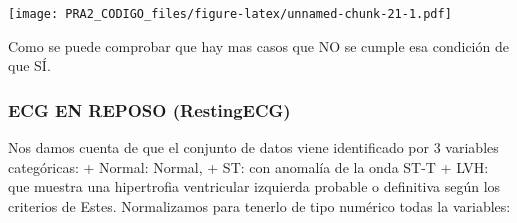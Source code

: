 \documentclass[
]{article}
\newenvironment{Shaded}{\begin{snugshade}}{\end{snugshade}}
\newcommand{\AttributeTok}[1]{\textcolor[rgb]{0.80,0.80,0.80}{#1}}
\newcommand{\ConstantTok}[1]{\textcolor[rgb]{0.86,0.64,0.64}{\textbf{#1}}}
\newcommand{\DecValTok}[1]{\textcolor[rgb]{0.86,0.86,0.80}{#1}}
\newcommand{\FloatTok}[1]{\textcolor[rgb]{0.75,0.75,0.82}{#1}}
\newcommand{\FunctionTok}[1]{\textcolor[rgb]{0.94,0.94,0.56}{#1}}
\newcommand{\NormalTok}[1]{\textcolor[rgb]{0.80,0.80,0.80}{#1}}
\newcommand{\OtherTok}[1]{\textcolor[rgb]{0.94,0.94,0.56}{#1}}
\newcommand{\SpecialCharTok}[1]{\textcolor[rgb]{0.86,0.64,0.64}{#1}}
\newcommand{\StringTok}[1]{\textcolor[rgb]{0.80,0.58,0.58}{#1}}
\begin{document}
\begin{Shaded}
\end{Shaded}

\texttt{[image: PRA2\_CODIGO\_files/figure-latex/unnamed-chunk-21-1.pdf]}

Como se puede comprobar que hay mas casos que NO se cumple esa condición
de que SÍ.

\hypertarget{ecg-en-reposo-restingecg}{%
\subsubsection{ECG EN REPOSO
(RestingECG)}\label{ecg-en-reposo-restingecg}}

Nos damos cuenta de que el conjunto de datos viene identificado por 3
variables categóricas: + Normal: Normal, + ST: con anomalía de la onda
ST-T + LVH: que muestra una hipertrofia ventricular izquierda probable o
definitiva según los criterios de Estes. Normalizamos para tenerlo de
tipo numérico todas la variables:
\end{document}
